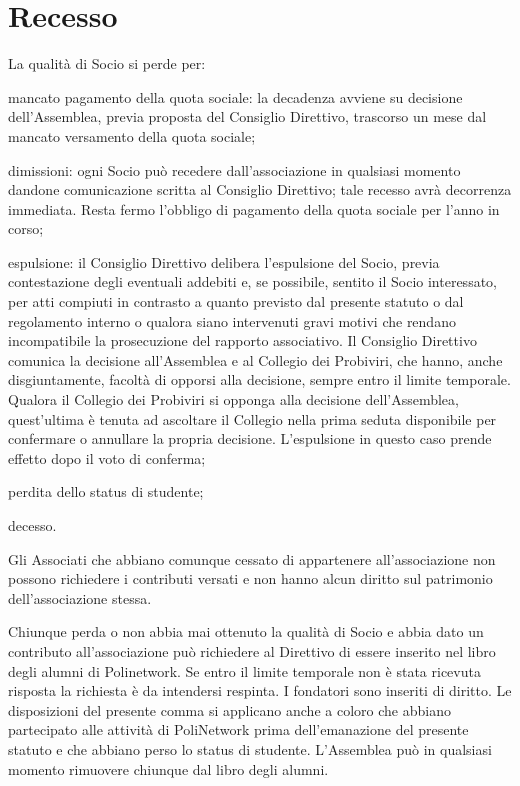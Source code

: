 \documentclass[legalpaper, 11pt]{exam}
\let\tempone\enumerate
\let\temptwo\endenumerate
\renewenvironment{enumerate}{\tempone\addtolength{\itemsep}{-0.45\baselineskip}}{\temptwo}
\begin{document}
{\section{Recesso}
\begin{enumerate}
 \item La qualità di Socio si perde per:
 \vspace{-5pt}
 \begin{enumerate}
  \item mancato pagamento della quota sociale: la decadenza avviene su decisione dell’Assemblea, previa proposta del Consiglio Direttivo, trascorso un mese dal mancato versamento della quota sociale;
  \item dimissioni: ogni Socio può recedere dall’associazione in qualsiasi momento dandone comunicazione scritta al Consiglio Direttivo; tale recesso avrà decorrenza immediata. Resta fermo l’obbligo di pagamento della quota sociale per l’anno in corso;
  \item espulsione: il Consiglio Direttivo delibera l’espulsione del Socio, previa contestazione degli eventuali addebiti e, se possibile, sentito il Socio interessato, per atti compiuti in contrasto a quanto previsto dal presente statuto o dal regolamento interno o qualora siano intervenuti gravi motivi che rendano incompatibile la prosecuzione del rapporto associativo. Il Consiglio Direttivo comunica la decisione all’Assemblea e al Collegio dei Probiviri, che hanno, anche disgiuntamente, facoltà di opporsi alla decisione, sempre entro il limite temporale. Qualora il Collegio dei Probiviri si opponga alla decisione dell'Assemblea, quest'ultima è tenuta ad ascoltare il Collegio nella prima seduta disponibile per confermare o annullare la propria decisione. L'espulsione in questo caso prende effetto dopo il voto di conferma;
  \item perdita dello status di studente;
  \item decesso.
 \end{enumerate}

 \item Gli Associati che abbiano comunque cessato di appartenere all’associazione non possono richiedere i contributi versati e non hanno alcun diritto sul patrimonio dell’associazione stessa.
 \item Chiunque perda o non abbia mai ottenuto la qualità di Socio e abbia dato un contributo all’associazione può richiedere al Direttivo di essere inserito nel libro degli alumni di Polinetwork. Se entro il limite temporale non è stata ricevuta risposta la richiesta è da intendersi respinta. I fondatori sono inseriti di diritto. Le disposizioni del presente comma si applicano anche a coloro che abbiano partecipato alle attività di PoliNetwork prima dell’emanazione del presente statuto e che abbiano perso lo status di studente. L'Assemblea può in qualsiasi momento rimuovere chiunque dal libro degli alumni.
\end{enumerate}

}
\end{document}
